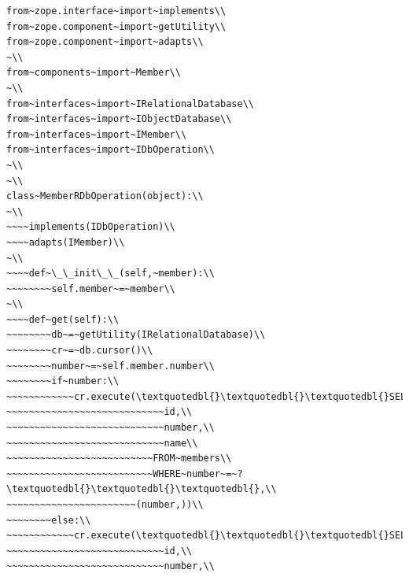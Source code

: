 \documentclass[a4paper,openany,twoside,draft]{book}
\begin{document}
\begin{verbatim}
from~zope.interface~import~implements\\
from~zope.component~import~getUtility\\
from~zope.component~import~adapts\\
~\\
from~components~import~Member\\
~\\
from~interfaces~import~IRelationalDatabase\\
from~interfaces~import~IObjectDatabase\\
from~interfaces~import~IMember\\
from~interfaces~import~IDbOperation\\
~\\
~\\
class~MemberRDbOperation(object):\\
~\\
~~~~implements(IDbOperation)\\
~~~~adapts(IMember)\\
~\\
~~~~def~\_\_init\_\_(self,~member):\\
~~~~~~~~self.member~=~member\\
~\\
~~~~def~get(self):\\
~~~~~~~~db~=~getUtility(IRelationalDatabase)\\
~~~~~~~~cr~=~db.cursor()\\
~~~~~~~~number~=~self.member.number\\
~~~~~~~~if~number:\\
~~~~~~~~~~~~cr.execute(\textquotedbl{}\textquotedbl{}\textquotedbl{}SELECT\\
~~~~~~~~~~~~~~~~~~~~~~~~~~~~id,\\
~~~~~~~~~~~~~~~~~~~~~~~~~~~~number,\\
~~~~~~~~~~~~~~~~~~~~~~~~~~~~name\\
~~~~~~~~~~~~~~~~~~~~~~~~~~FROM~members\\
~~~~~~~~~~~~~~~~~~~~~~~~~~WHERE~number~=~?\textquotedbl{}\textquotedbl{}\textquotedbl{},\\
~~~~~~~~~~~~~~~~~~~~~~~(number,))\\
~~~~~~~~else:\\
~~~~~~~~~~~~cr.execute(\textquotedbl{}\textquotedbl{}\textquotedbl{}SELECT\\
~~~~~~~~~~~~~~~~~~~~~~~~~~~~id,\\
~~~~~~~~~~~~~~~~~~~~~~~~~~~~number,\\

\end{verbatim}
\end{document}
